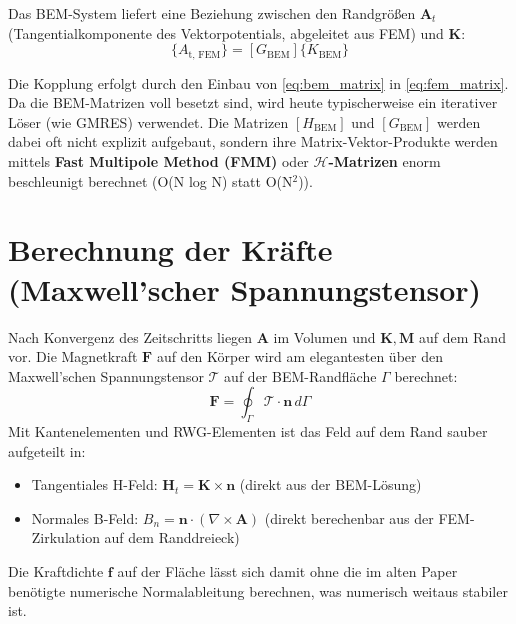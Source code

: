 \documentclass[11pt,a4paper]{article}
\newcommand{\vA}{\bm{A}}
\newcommand{\vH}{\bm{H}}
\newcommand{\vn}{\bm{n}}
\newcommand{\vK}{\bm{K}} %
\newcommand{\vM}{\bm{M}} %
\newcommand{\rot}{\nabla \times}
\begin{document}
Das BEM-System liefert eine Beziehung zwischen den Randgrößen $\vA_t$ (Tangentialkomponente des Vektorpotentials, abgeleitet aus FEM) und $\vK$:
\begin{equation}
    [H_{\text{BEM}}] \{A_{\text{t, FEM}}\} = [G_{\text{BEM}}] \{K_{\text{BEM}}\} \label{eq:bem_matrix}
\end{equation}

Die Kopplung erfolgt durch den Einbau von \eqref{eq:bem_matrix} in \eqref{eq:fem_matrix}. Da die BEM-Matrizen voll besetzt sind, wird heute typischerweise ein iterativer Löser (wie GMRES) verwendet. Die Matrizen $[H_{\text{BEM}}]$ und $[G_{\text{BEM}}]$ werden dabei oft nicht explizit aufgebaut, sondern ihre Matrix-Vektor-Produkte werden mittels \textbf{Fast Multipole Method (FMM)} oder \textbf{$\mathcal{H}$-Matrizen} enorm beschleunigt berechnet (O(N log N) statt O(N$^2$)).

\section{Berechnung der Kräfte (Maxwell'scher Spannungstensor)}

Nach Konvergenz des Zeitschritts liegen $\vA$ im Volumen und $\vK, \vM$ auf dem Rand vor. Die Magnetkraft $\bm{F}$ auf den Körper wird am elegantesten über den Maxwell'schen Spannungstensor $\mathcal{T}$ auf der BEM-Randfläche $\Gamma$ berechnet:
\begin{equation}
    \bm{F} = \oint_{\Gamma} \mathcal{T} \cdot \vn \, d\Gamma
\end{equation}
Mit Kantenelementen und RWG-Elementen ist das Feld auf dem Rand sauber aufgeteilt in:
\begin{itemize}
    \item Tangentiales H-Feld: $\vH_t = \vK \times \vn$ (direkt aus der BEM-Lösung)
    \item Normales B-Feld: $B_n = \vn \cdot (\rot \vA)$ (direkt berechenbar aus der FEM-Zirkulation auf dem Randdreieck)
\end{itemize}
Die Kraftdichte $\bm{f}$ auf der Fläche lässt sich damit ohne die im alten Paper benötigte numerische Normalableitung berechnen, was numerisch weitaus stabiler ist.
\end{document}
